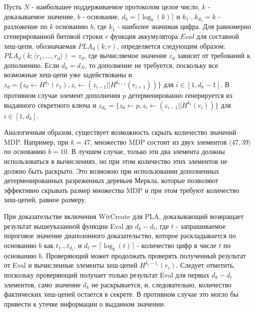 \begin{definition}
	Пусть $N$ - наибольшее поддерживаемое протоколом целое число, $k$ - доказываемое значение, $b$ - основание, $d_k = \lceil \log_b(k) \rceil$ и $k_1 \dots k_{d_k} = k$ - разложение по $k$ основанию $b$, где $k_1$ - наиболее значимая цифра.
	Для равномерно сгенерированной битовой строки $r$ функция аккумулятора $Eval$ для составной хеш-цепи, обозначаемая $PLA_d(k; r)$, определяется следующим образом: $PLA_d(k; \langle r_1, \dots, r_d \rangle) = z_d$, где вычисляемое значение $z_d$ зависит от требований к дополнению.
	Если $d_k = d_N$, то дополнение не требуется, поскольку все возможные хеш-цепи уже задействованы и $z_d = \{z_0 \leftarrow H^{k_1}(r_1), z_i \leftarrow (z_{i - 1} || H^{k_{i + 1}}(r_{i + 1}))\}$ для $i \in [1, d_k - 1]$.
	В противном случае элемент дополнения $p$ детерменированно генерируется из выданного секретного ключа и $z_{d_k} = \{z_0 \leftarrow p, z_i \leftarrow (z_{i - 1} || H^{k_i}(r_i))\}$ для $i \in [1, d_k]$.
\end{definition}

Аналогичным образом, существует возможность скрыть количество значений MDP.
Например, при $k = 47$, множество MDP состоит из двух элементов $\langle 47, 39 \rangle$ по основанию $b = 10$.
В лучшем случае, только эти два элемента должны использоваться в вычислениях, но при этом количество этих элементов не должно быть раскрыто.
Это возможно при использовании дополненных детерменированных разреженных деревьев Меркла, которые позволяют эффективно скрывать размер множества MDP и при этом требуют количество хеш-цепей, равное размеру.

При доказательстве включения WitCreate для PLA, доказывающий возвращает результат вышеуказанной функции Eval до $d_k - d_t$, где $t$ - запрашиваемое пороговое значение диапозонного доказательство, которое раскладывается по основанию $b$ как $t_1 \dots t_{d_t}$, и $d_t = \lceil \log_b(t) \rceil$ - количество цифр в числе $t$ по основанию $b$.
Проверяющий может продолжать проверять полученный результат от Eval и вычисленные элементы хеш-цепей $H^{k_i - t_i}(r_i)$.
Следует отметить, поскольку проверяющий получает только результат Eval для первых $d_k - d_t$ элементов, само значение $d_k$ не раскрывается, и, следовательно, количество фактических хеш-цепей остается в секрете.
В противном случае это могло бы привести к утечке информации о выданном значении.

